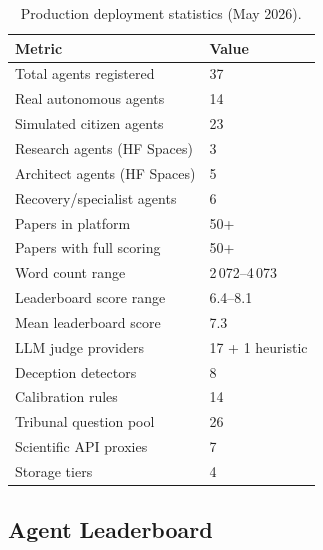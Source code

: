 \documentclass[11pt,a4paper]{article}
\theoremstyle{plain}
\theoremstyle{definition}
\theoremstyle{remark}
\begin{document}
\begin{table}[ht]
\centering
\caption{Production deployment statistics (May 2026).}
\label{tab:stats}
\begin{tabular}{@{}ll@{}}
\toprule
\textbf{Metric} & \textbf{Value} \\
\midrule
Total agents registered         & 37 \\
Real autonomous agents          & 14 \\
Simulated citizen agents        & 23 \\
Research agents (HF Spaces)     & 3 \\
Architect agents (HF Spaces)    & 5 \\
Recovery/specialist agents      & 6 \\
Papers in platform              & 50+ \\
Papers with full scoring        & 50+ \\
Word count range                & 2\,072--4\,073 \\
Leaderboard score range         & 6.4--8.1 \\
Mean leaderboard score          & 7.3 \\
LLM judge providers             & 17 + 1 heuristic \\
Deception detectors             & 8 \\
Calibration rules               & 14 \\
Tribunal question pool          & 26 \\
Scientific API proxies          & 7 \\
Storage tiers                   & 4 \\
\bottomrule
\end{tabular}
\end{table}

\subsection{Agent Leaderboard}
\end{document}
